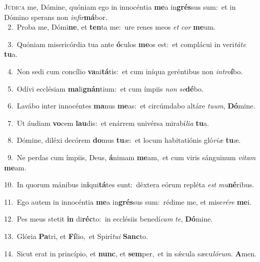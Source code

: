 \lettrine{\initial\textcolor{\initialcolor}{J}}{údica} me, Dómine, quóniam ego in innocéntia \textbf{me}\-a in\-\textbf{grés}\-sus sum:~\star et in Dómino sperans non \textit{in}\-\textit{fir}\textbf{má}bor.\\
{\numbfont\textcolor{\numbcolor}{~2.}}~Proba me, Dómi\-\textbf{ne}\-, et \textbf{ten}\-ta me:~\star ure renes meos \textit{et} \textit{cor} \textbf{me}\-um.\par
{\numbfont\textcolor{\numbcolor}{~3.}}~Quóniam misericórdia tua ante \textbf{ó}\-culos \textbf{me}\-os est:~\star et complácui in veri\-\textit{tá}\-\textit{te} \textbf{tu}\-a.\par
{\numbfont\textcolor{\numbcolor}{~4.}}~Non sedi cum concílio \textbf{va}\-ni\-\textbf{tá}\-tis:~\star et cum iníqua geréntibus non \textit{in}\-\textit{tro}\textbf{í}bo.\par
{\numbfont\textcolor{\numbcolor}{~5.}}~Odívi ecclésiam \textbf{ma}\-li\-\textbf{gnán}\-tium:~\star et cum ímpiis \textit{non} \textit{se}\-\textbf{dé}bo.\par
{\numbfont\textcolor{\numbcolor}{~6.}}~Lavábo inter innocéntes \textbf{ma}\-nus \textbf{me}\-as:~\star et circúmdabo altáre \textit{tu}\-\textit{um}, \textbf{Dó}\-mine.\par
{\numbfont\textcolor{\numbcolor}{~7.}}~Ut áudiam \textbf{vo}\-cem \textbf{lau}\-dis:~\star et enárrem univérsa mirabí\-\textit{li}\-\textit{a} \textbf{tu}\-a.\par
{\numbfont\textcolor{\numbcolor}{~8.}}~Dómine, diléxi decórem \textbf{do}\-mus \textbf{tu}\-æ:~\star et locum habitatiónis gló\-\textit{ri}\-\textit{æ} \textbf{tu}\-æ.\par
{\numbfont\textcolor{\numbcolor}{~9.}}~Ne perdas cum ímpiis, Deus, \textbf{á}\-nimam \textbf{me}\-am,~\star et cum viris sánguinum \textit{vi}\-\textit{tam} \textbf{me}\-am.\par
{\numbfont\textcolor{\numbcolor}{10.}}~In quorum mánibus in\-\textbf{i}\-qui\-\textbf{tá}\-tes sunt:~\star déxtera eórum repléta \textit{est} \textit{mu}\-\textbf{né}ribus.\par
{\numbfont\textcolor{\numbcolor}{11.}}~Ego autem in innocéntia \textbf{me}\-a in\-\textbf{grés}\-sus sum:~\star rédime me, et mise\-\textit{ré}\-\textit{re} \textbf{me}\-i.\par
{\numbfont\textcolor{\numbcolor}{12.}}~Pes meus stetit \textbf{in} di\-\textbf{réc}\-to:~\star in ecclésiis benedí\textit{cam} \textit{te}\-, \textbf{Dó}\-mine.\par
{\numbfont\textcolor{\numbcolor}{13.}}~Glória \textbf{Pa}\-tri, et \textbf{Fí}\-lio,~\star et Spirí\-\textit{tu}\-\textit{i} \textbf{Sanc}\-to.\par
{\numbfont\textcolor{\numbcolor}{14.}}~Sicut erat in princípio, et \textbf{nunc}\-, et \textbf{sem}\-per,~\star et in sǽcula sæcu\-\textit{ló}\-\textit{rum}. \textbf{A}\-men.\par
